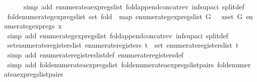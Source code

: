 \begin{isabellebody}
%
\isadelimproof
\ \ \ \ %
\endisadelimproof
%
\isatagproof
{}\isamarkupfalse%
\ {\isacharparenleft}simp\ add{\isacharcolon}\ enumerate{\isacharunderscore}aexp{\isacharunderscore}regs{\isacharunderscore}list\ fold{\isacharunderscore}append{\isacharunderscore}concat{\isacharunderscore}rev\ inf{\isacharunderscore}sup{\isacharunderscore}aci{\isacharparenleft}{}{\isacharparenright}\ split{\isacharunderscore}def{\isacharparenright}%
\endisatagproof
{\isafoldproof}%
%
\isadelimproof
\isanewline
%
\endisadelimproof
\isanewline
{}\isamarkupfalse%
\ fold{\isacharunderscore}enumerate{\isacharunderscore}gexp{\isacharunderscore}regs{\isacharunderscore}list{\isacharcolon}\ {\isachardoublequoteopen}set\ {\isacharparenleft}fold\ {\isacharparenleft}{\isacharat}{\isacharparenright}\ {\isacharparenleft}map\ enumerate{\isacharunderscore}gexp{\isacharunderscore}regs{\isacharunderscore}list\ G{\isacharparenright}\ {\isacharbrackleft}{\isacharbrackright}{\isacharparenright}\ {\isacharequal}\ {\isacharparenleft}{\isasymUnion}x{\isasymin}set\ G{\isachardot}\ enumerate{\isacharunderscore}gexp{\isacharunderscore}regs\ x{\isacharparenright}{\isachardoublequoteclose}\isanewline
%
\isadelimproof
\ \ \ \ %
\endisadelimproof
%
\isatagproof
{}\isamarkupfalse%
\ {\isacharparenleft}simp\ add{\isacharcolon}\ enumerate{\isacharunderscore}gexp{\isacharunderscore}regs{\isacharunderscore}list\ fold{\isacharunderscore}append{\isacharunderscore}concat{\isacharunderscore}rev\ inf{\isacharunderscore}sup{\isacharunderscore}aci{\isacharparenleft}{}{\isacharparenright}\ split{\isacharunderscore}def{\isacharparenright}%
\endisatagproof
{\isafoldproof}%
%
\isadelimproof
\isanewline
%
\endisadelimproof
\isanewline
{}\isamarkupfalse%
\ set{\isacharunderscore}enumerate{\isacharunderscore}registers{\isacharunderscore}list{\isacharcolon}\ {\isachardoublequoteopen}enumerate{\isacharunderscore}registers\ t\ {\isacharequal}\ set\ {\isacharparenleft}enumerate{\isacharunderscore}registers{\isacharunderscore}list\ t{\isacharparenright}{\isachardoublequoteclose}\isanewline
%
\isadelimproof
\ \ %
\endisadelimproof
%
\isatagproof
{}\isamarkupfalse%
\ {\isacharparenleft}simp\ add{\isacharcolon}\ enumerate{\isacharunderscore}registers{\isacharunderscore}list{\isacharunderscore}def\ enumerate{\isacharunderscore}registers{\isacharunderscore}def{\isacharparenright}\isanewline
\ \ \isamarkupfalse%
\ {\isacharparenleft}simp\ add{\isacharcolon}\ fold{\isacharunderscore}enumerate{\isacharunderscore}aexp{\isacharunderscore}regs{\isacharunderscore}list\ fold{\isacharunderscore}enumerate{\isacharunderscore}aexp{\isacharunderscore}regs{\isacharunderscore}list{\isacharunderscore}pairs\ fold{\isacharunderscore}enumerate{\isacharunderscore}aexp{\isacharunderscore}regs{\isacharunderscore}list{\isacharunderscore}pairs{\isacharunderscore}{}{\isacharparenright}\isanewline

\end{isabellebody}
